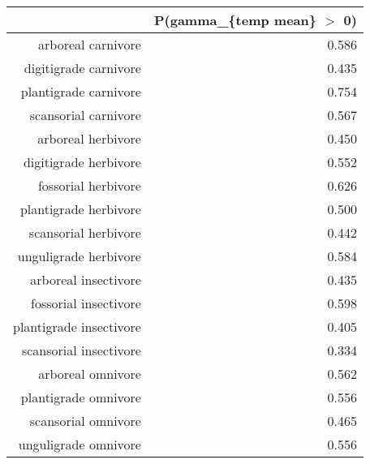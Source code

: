 \begin{table}[ht]
\centering
\begin{tabular}{rr}
  \hline
 & P(gamma\_\{temp mean\} $>$ 0) \\ 
  \hline
arboreal carnivore & 0.586 \\ 
  digitigrade carnivore & 0.435 \\ 
  plantigrade carnivore & 0.754 \\ 
  scansorial carnivore & 0.567 \\ 
  arboreal herbivore & 0.450 \\ 
  digitigrade herbivore & 0.552 \\ 
  fossorial herbivore & 0.626 \\ 
  plantigrade herbivore & 0.500 \\ 
  scansorial herbivore & 0.442 \\ 
  unguligrade herbivore & 0.584 \\ 
  arboreal insectivore & 0.435 \\ 
  fossorial insectivore & 0.598 \\ 
  plantigrade insectivore & 0.405 \\ 
  scansorial insectivore & 0.334 \\ 
  arboreal omnivore & 0.562 \\ 
  plantigrade omnivore & 0.556 \\ 
  scansorial omnivore & 0.465 \\ 
  unguligrade omnivore & 0.556 \\ 
   \hline
\end{tabular}
\label{tab:surv_temp}
\end{table}
